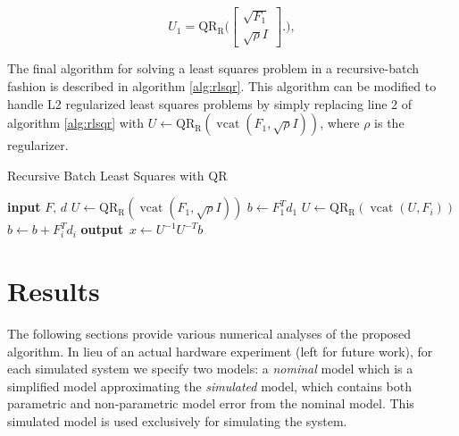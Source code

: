 \documentclass{article}
\begin{document}
\begin{equation}
  U_1 =  \operatorname{QR_R}\bigg( 
  \begin{bmatrix} \sqrt{F_1} \\ \sqrt{\rho} I \end{bmatrix}.
  \bigg),
\end{equation}

The final algorithm for solving a least squares problem in a recursive-batch fashion is
described in algorithm \ref{alg:rlsqr}. This algorithm can be modified to handle L2
regularized least squares problems by simply replacing line 2 of algorithm \ref{alg:rlsqr}
with $U\leftarrow \operatorname{QR_R}(\operatorname{vcat}(F_1,\sqrt{\rho}I))$, where $\rho$
is the regularizer. 
\begin{algorithm} 
  \begin{algorithmic}[1]
    \caption{Recursive Batch Least Squares with QR}\label{alg:rlsqr}
    \State \textbf{input} $F,\,d$  
    \State $U \leftarrow \operatorname{QR_R}(\operatorname{vcat}(F_1,\sqrt{\rho}I))$ 
    \State $b \leftarrow F_1^Td_1$ 
    \State $U \leftarrow \operatorname{QR_R}(\operatorname{vcat}(U,F_i)) $ 
    \State $b \leftarrow b + F_i^Td_i$ 
    \EndFor
    \State \textbf{output} \,$x \leftarrow U^{-1}U^{-T}b$ 
  \end{algorithmic}
\end{algorithm}

\section{Results} \label{sec:results}

The following sections provide various numerical analyses of the proposed algorithm.  In
lieu of an actual hardware experiment (left for future work), for each simulated system we
specify two models: a \textit{nominal} model which is a simplified model approximating the
\textit{simulated} model, which contains both parametric and non-parametric model error from
the nominal model. This simulated model is used exclusively for simulating the system.
\end{document}
